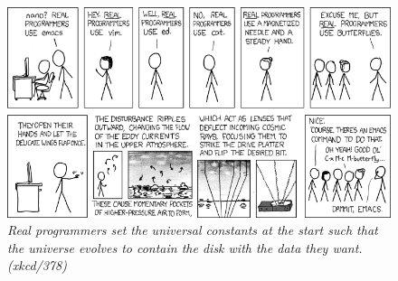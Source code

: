 \begin{figure}[h!]
\centering \includegraphics[width=\linewidth]{img/xkcd/real_programmers.png}
\caption*{{\small \textit{Real programmers set the universal constants at the start such that the universe evolves to contain the disk with the data they want. (xkcd/378)}}}
\end{figure}
